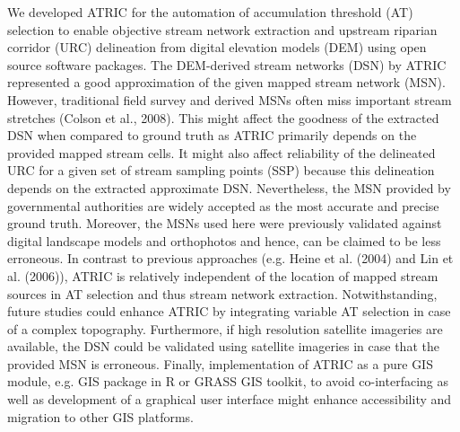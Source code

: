 We developed ATRIC for the automation of accumulation threshold (AT) selection to enable objective stream network extraction and upstream riparian corridor (URC) delineation from digital elevation models (DEM) using open source software packages. The DEM-derived stream networks (DSN) by ATRIC represented a good approximation of the given mapped stream network (MSN). However, traditional field survey and derived MSNs often miss important stream stretches (Colson et al., 2008). This might affect the goodness of the extracted DSN when compared to ground truth as ATRIC primarily depends on the provided mapped stream cells. It might also affect reliability of the delineated URC for a given set of stream sampling points (SSP) because this delineation depends on the extracted approximate DSN. Nevertheless, the MSN provided by governmental authorities are widely accepted as the most accurate and precise ground truth. Moreover, the MSNs used here were previously validated against digital landscape models and orthophotos and hence, can be claimed to be less erroneous. In contrast to previous approaches (e.g. Heine et al. (2004) and Lin et al. (2006)), ATRIC is relatively independent of the location of mapped stream sources in AT selection and thus stream network extraction. Notwithstanding, future studies could enhance ATRIC by integrating variable AT selection in case of a complex topography. Furthermore, if high resolution satellite imageries are available, the DSN could be validated using satellite imageries in case that the provided MSN is erroneous. Finally, implementation of ATRIC as a pure GIS module, e.g. GIS package in R or GRASS GIS toolkit, to avoid co-interfacing as well as development of a graphical user interface might enhance accessibility and migration to other GIS platforms.

\openleft

\begingroup

\renewcommand{\addcontentsline}[3]{}

